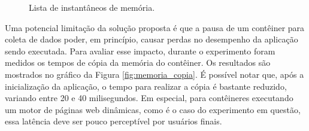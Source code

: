 \documentclass[conference]{IEEEtran}
\newcommand{\marcos}[1]{{\color{blue}{MARCOS: #1}}}
\newcommand{\marcosT}[1]{{\color{red}{TODO: #1}}}
\begin{document}
\begin{figure}[htb!]
\caption{Lista de instantâneos de memória.}
\centering
\label{fig:memoria_salva}
\end{figure}


%
%
%

Uma potencial limitação da solução proposta é que a pausa de um contêiner para coleta de dados poder, em princípio, causar perdas no desempenho da aplicação sendo executada. 
%
Para avaliar esse impacto, durante o experimento foram medidos os tempos de cópia da memória do contêiner.
%
Os resultados são mostrados no gráfico da Figura \ref{fig:memoria_copia}.
%
É possível notar que, após a inicialização da aplicação, o tempo para realizar a cópia é bastante reduzido, variando entre 20 e 40 milisegundos. 
%
Em especial, para contêineres executando um motor de páginas web dinâmicas, como é o caso do experimento em questão, essa latência deve ser pouco perceptível por usuários finais.


%
\end{document}
